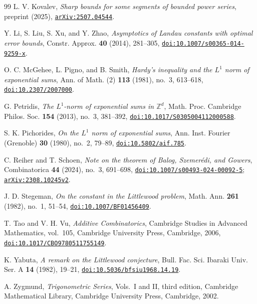 \documentclass[11pt,reqno]{amsart}
\numberwithin{equation}{section}
\theoremstyle{definition}
\theoremstyle{remark}
\newcommand{\Z}{\mathbb Z}
\newcommand{\doi}[1]{\href{https://doi.org/#1}{\texttt{doi:#1}}}
\newcommand{\arxiv}[1]{\href{https://arxiv.org/abs/#1}{\texttt{arXiv:#1}}}
\begin{document}
\begin{thebibliography}{99}
L. V. Kovalev, \emph{Sharp bounds for some segments of bounded power
series}, preprint (2025), \arxiv{2507.04544}.

Y. Li, S. Liu, S. Xu, and Y. Zhao, \emph{Asymptotics of Landau constants
with optimal error bounds}, Constr. Approx. \textbf{40} (2014),
281--305, \doi{10.1007/s00365-014-9259-x}.

O. C. McGehee, L. Pigno, and B. Smith, \emph{Hardy's inequality and the
$L^1$ norm of exponential sums}, Ann. of Math. (2) \textbf{113} (1981),
no.~3, 613--618, \doi{10.2307/2007000}.

G. Petridis, \emph{The $L^1$-norm of exponential sums in $\Z^d$},
Math. Proc. Cambridge Philos. Soc. \textbf{154} (2013), no.~3,
381--392, \doi{10.1017/S0305004112000588}.

S. K. Pichorides, \emph{On the $L^1$ norm of exponential sums},
Ann. Inst. Fourier (Grenoble) \textbf{30} (1980), no.~2, 79--89,
\doi{10.5802/aif.785}.

C. Reiher and T. Schoen, \emph{Note on the theorem of Balog,
Szemer\'edi, and Gowers}, Combinatorica \textbf{44} (2024), no.~3,
691--698, \doi{10.1007/s00493-024-00092-5}; \arxiv{2308.10245v2}.

J. D. Stegeman, \emph{On the constant in the Littlewood problem},
Math. Ann. \textbf{261} (1982), no.~1, 51--54,
\doi{10.1007/BF01456409}.

T. Tao and V. H. Vu, \emph{Additive Combinatorics}, Cambridge Studies
in Advanced Mathematics, vol.~105, Cambridge University Press,
Cambridge, 2006, \doi{10.1017/CBO9780511755149}.

K. Yabuta, \emph{A remark on the Littlewood conjecture}, Bull. Fac.
Sci. Ibaraki Univ. Ser. A \textbf{14} (1982), 19--21,
\doi{10.5036/bfsiu1968.14.19}.

A. Zygmund, \emph{Trigonometric Series}, Vols.~I and II, third edition,
Cambridge Mathematical Library, Cambridge University Press,
Cambridge, 2002.

\end{thebibliography}
\end{document}
